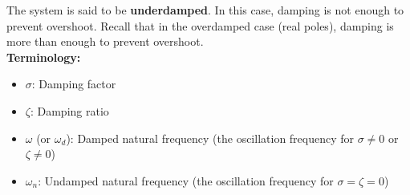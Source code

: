 \documentclass{book}
\begin{document}
The system is said to be \textbf{underdamped}. In this case, damping is not enough to prevent overshoot. Recall that in the overdamped case (real poles), damping is more than enough to prevent overshoot.\\

\textbf{Terminology:}
\begin{itemize}
	\item \textbf{$ \sigma $}: Damping factor
	\item \textbf{$ \zeta $}: Damping ratio
	\item \textbf{$ \omega $} (or $ \omega_d $): Damped natural frequency (the oscillation frequency for $ \sigma\neq0 $ or $ \zeta\neq0 $)
	\item \textbf{$ \omega_n $}: Undamped natural frequency (the oscillation frequency for $ \sigma=\zeta=0 $)
\end{itemize}
\end{document}
